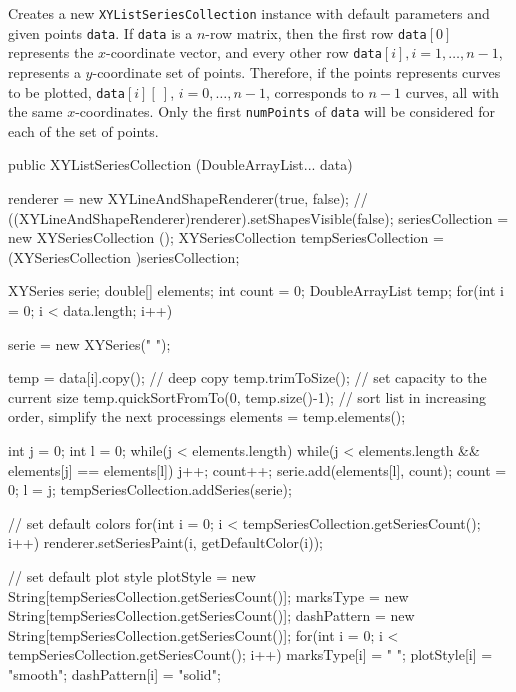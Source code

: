 \begin{tabb}
   Creates a new \texttt{XYListSeriesCollection} instance with default
   parameters and given points \texttt{data}.
 If \texttt{data} is a $n$-row matrix,
 then the first row \texttt{data}$[0]$ represents the
 $x$-coordinate vector, and every other row \texttt{data}$[i],
   i=1,\ldots, n-1$, represents a $y$-coordinate set of points.
  Therefore, if the points represents curves to be plotted,
   \texttt{data}$[i][\ ]$, $i=0,\ldots, n-1$,  corresponds
   to $n-1$ curves, all with the same $x$-coordinates.
   Only the first \texttt{numPoints} of \texttt{data} will be considered
for each of the set of points.
\end{tabb}
\begin{htmlonly}
\end{htmlonly}
\begin{code}

   public XYListSeriesCollection (DoubleArrayList... data) \begin{hide} {
      renderer = new XYLineAndShapeRenderer(true, false);
     // ((XYLineAndShapeRenderer)renderer).setShapesVisible(false);
      seriesCollection = new XYSeriesCollection ();
      XYSeriesCollection tempSeriesCollection = (XYSeriesCollection )seriesCollection;

      XYSeries serie;
      double[] elements;
      int count = 0;
      DoubleArrayList temp;
      for(int i = 0; i < data.length; i++) {
         serie = new XYSeries(" ");

         temp = data[i].copy();  // deep copy
         temp.trimToSize();      // set capacity to the current size
         temp.quickSortFromTo(0, temp.size()-1);   // sort list in increasing order, simplify the next processings
         elements = temp.elements();

         int j = 0;
         int l = 0;
         while(j < elements.length) {
            while(j < elements.length && elements[j] == elements[l]) {
               j++;
               count++;
            }
            serie.add(elements[l], count);
            count = 0;
            l = j;
         }
         tempSeriesCollection.addSeries(serie);
      }

      // set default colors
      for(int i = 0; i < tempSeriesCollection.getSeriesCount(); i++) {
         renderer.setSeriesPaint(i, getDefaultColor(i));
      }

      // set default plot style
      plotStyle = new String[tempSeriesCollection.getSeriesCount()];
      marksType = new String[tempSeriesCollection.getSeriesCount()];
      dashPattern = new String[tempSeriesCollection.getSeriesCount()];
      for(int i = 0; i < tempSeriesCollection.getSeriesCount(); i++) {
         marksType[i] = " ";
         plotStyle[i] = "smooth";
         dashPattern[i] = "solid";
      }
   }\end{hide}
\end{code}
